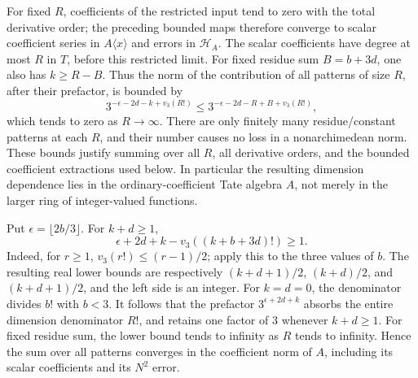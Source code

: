 \documentclass[11pt,a4paper]{article}
\theoremstyle{definition}\newtheorem{definition}[theorem]{Definition}
\theoremstyle{remark}\newtheorem{remark}[theorem]{Remark}
\numberwithin{equation}{section}
\begin{document}
For fixed $R$, coefficients of the restricted input tend to zero with
the total derivative order; the preceding bounded maps therefore
converge to scalar coefficient series in $A\langle x\rangle$ and
errors in $\mathcal H_A$.  The scalar coefficients have degree at
most $R$ in $T$, before this restricted limit.  For fixed residue
sum $B=b+3d$, one also has $k\ge R-B$.  Thus the norm of the
contribution of all patterns of size $R$, after their prefactor, is
bounded by
\[
 3^{-\epsilon-2d-k+v_3(R!)}
       \le 3^{-\epsilon-2d-R+B+v_3(R!)},
\]
which tends to zero as $R\longrightarrow\infty$.
There are only finitely many residue/constant patterns at each $R$,
and their number causes no loss in a nonarchimedean norm.  These bounds
justify summing over all $R$, all derivative orders, and the bounded
coefficient extractions used below.  In particular the resulting
dimension dependence lies in the ordinary-coefficient Tate algebra
$A$, not merely in the larger ring of integer-valued functions.

Put $\epsilon=\lfloor2b/3\rfloor$.  For $k+d\ge1$,
\[
 \epsilon+2d+k-v_3((k+b+3d)!)\ge1.
\tag{5}
\]
Indeed, for $r\ge1$, $v_3(r!)\le(r-1)/2$; apply this to the three
values of $b$.  The resulting real lower bounds are respectively
$(k+d+1)/2$, $(k+d)/2$, and $(k+d+1)/2$, and the left side is an
integer.  For $k=d=0$, the denominator divides $b!$ with $b<3$.
It follows that the prefactor $3^{\epsilon+2d+k}$ absorbs the entire
dimension denominator $R!$, and retains one factor of $3$ whenever
$k+d\ge1$.  For fixed residue sum, the lower bound tends to infinity
as $R$ tends to infinity.  Hence the sum over all patterns converges
in the coefficient norm of $A$, including its scalar coefficients
and its $N^2$ error.
\end{document}
